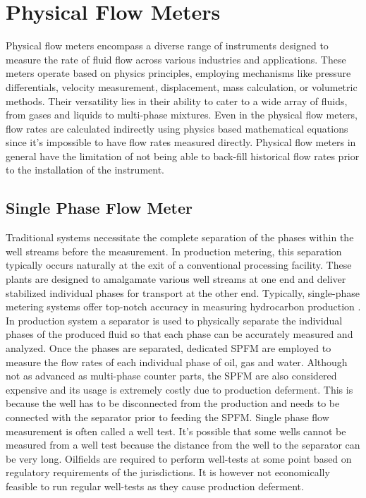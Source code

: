 \documentclass[12pt,APA]{uomthesis}
\begin{document}
\section{Physical Flow Meters}
Physical flow meters encompass a diverse range of instruments designed to measure the rate of fluid flow across various industries and applications. These meters operate based on physics principles, employing mechanisms like pressure differentials, velocity measurement, displacement, mass calculation, or volumetric methods. Their versatility lies in their ability to cater to a wide array of fluids, from gases and liquids to multi-phase mixtures. Even in the physical flow meters, flow rates are calculated indirectly using physics based mathematical equations since it's impossible to have flow rates measured directly. Physical flow meters in general have the limitation of not being able to back-fill historical flow rates prior to the installation of the instrument. 

\subsection{Single Phase Flow Meter}
Traditional  systems necessitate the complete separation of the phases within the well streams before the measurement. In production metering, this separation typically occurs naturally at the exit of a conventional processing facility. These plants are designed to amalgamate various well streams at one end and deliver stabilized individual phases for transport at the other end. Typically, single-phase metering systems offer top-notch accuracy in measuring hydrocarbon production \citep{corneliussen2005handbook}. In production system a  separator is used to physically separate the individual phases of the produced fluid so that each phase can be accurately measured and analyzed. Once the phases are separated, dedicated SPFM are employed to measure the flow rates of each individual phase of oil, gas and water. Although not as advanced as multi-phase counter parts, the SPFM are also considered expensive and its usage is extremely costly due to production deferment. This is because the well has to be disconnected from the production and needs to be connected with the separator prior to feeding the SPFM. Single phase flow measurement is often called a well test. It's possible that some wells cannot be measured from a well test because the distance from the well to the separator can be very long. Oilfields are required to perform well-tests at some point based on regulatory requirements of the jurisdictions. It is however not economically feasible to run regular well-tests as they cause production deferment.
 
\end{document}
